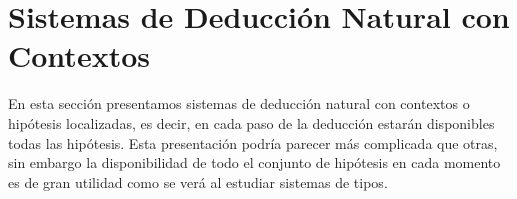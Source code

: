 \documentclass[11pt,letterpaper]{article}
\begin{document}

\section{Sistemas de Deducción Natural con Contextos}

En esta sección presentamos sistemas de deducción natural con
contextos o hipótesis localizadas, es decir, en cada paso de la
deducción estarán disponibles todas las hipótesis. Esta presentación podría
parecer más complicada que otras, sin embargo la disponibilidad de todo el
conjunto de hipótesis en cada momento es de gran utilidad como se verá
al estudiar sistemas de tipos.

\end{document}
